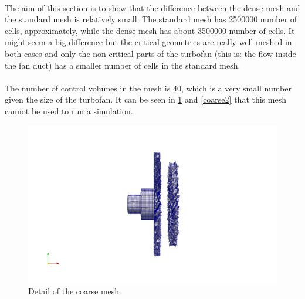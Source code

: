 \paragraph{}The aim of this section is to show that the difference between the dense mesh and the standard mesh is relatively small. The standard mesh has 2500000 number of cells, approximately, while the dense mesh has about 3500000 number of cells. It might seem a big difference but the critical geometries are really well meshed in both cases and only the non-critical parts of the turbofan (this is: the flow inside the fan duct) has a smaller number of cells in the standard mesh.

\newpage{}

\paragraph{}The number of control volumes in the mesh is 40, which is a very small number given the size of the turbofan. It can be seen in \ref{coarse1} and \ref{coarse2} that this mesh cannot be used to run a simulation.

\begin{figure}[h!]
\includegraphics[scale=0.25]{./mesh/newmesh/coarse15}
\centering
\caption{Detail of the coarse mesh}
\label{coarse1}
\end{figure}

